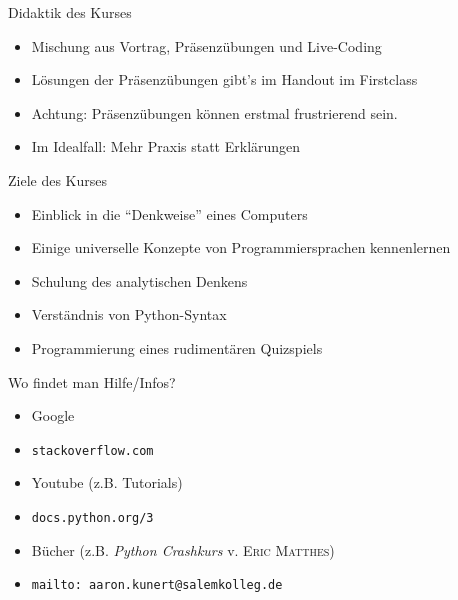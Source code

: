 \begin{frame}
	\begin{block}{Didaktik des Kurses}
		\begin{itemize}
			\item Mischung aus Vortrag, Präsenzübungen und Live-Coding
			\item Lösungen der Präsenzübungen gibt's im Handout im Firstclass
			\item Achtung: Präsenzübungen können erstmal frustrierend sein. 
			\item Im Idealfall: Mehr Praxis statt Erklärungen
		\end{itemize}
	\end{block}
\end{frame}

\begin{frame}
	\begin{block}{Ziele des Kurses}
		\begin{itemize}
			\item Einblick in die \enquote{Denkweise} eines Computers
			\item Einige universelle Konzepte von Programmiersprachen kennenlernen
			\item Schulung des analytischen Denkens
			\item Verständnis von Python-Syntax
			\item Programmierung eines rudimentären Quizspiels
		\end{itemize}
	\end{block}
\end{frame}

\begin{frame}
	\begin{block}{Wo findet man Hilfe/Infos?}
		\vspace{2pt}
		\begin{itemize}
			\item Google
			\item \texttt{stackoverflow.com}
			\item Youtube (z.B. Tutorials)
			\item \texttt{docs.python.org/3}
			\item Bücher (z.B. \textit{Python Crashkurs} v. \textsc{Eric Matthes})
			\item \texttt{mailto: aaron.kunert@salemkolleg.de}
		\end{itemize}
	\end{block}
\end{frame}



